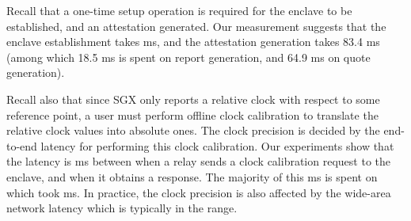 Recall that a one-time setup operation is required 
for the enclave to be established, and an attestation generated. 
Our measurement suggests that the enclave establishment takes
 ms, 
and the attestation generation takes 
83.4 ms (among which 
18.5 ms is spent 
on report generation, 
and 64.9 ms on quote generation).

Recall also that since SGX only reports a relative clock
with respect to some reference point,  
a user must perform offline clock calibration 
to translate the  relative clock values into absolute ones.
The clock precision is decided
by the end-to-end latency for performing 
this clock calibration. 
Our experiments show that the latency is  ms 
between when a relay sends a clock calibration request
to the enclave, and when it obtains a response.
The majority of this  ms is spent on
which took  ms.
In practice, the clock precision is also affected
by the wide-area network latency
which is typically in the  range.

%
%
%
%
%
